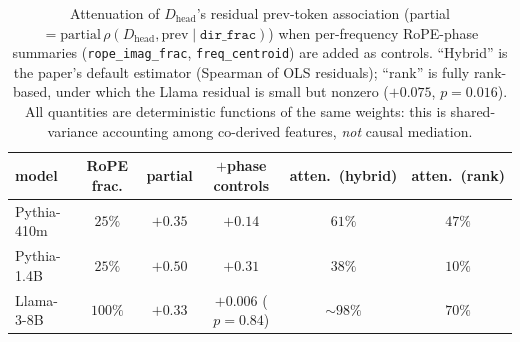 \documentclass[11pt]{article}
\newcommand{\dirfrac}{\texttt{dir\_frac}\xspace}
\newcommand{\Dhead}{\ensuremath{D_{\text{head}}}\xspace}
\newcommand{\ropeimag}{\texttt{rope\_imag\_frac}\xspace}
\newcommand{\Rope}{RoPE\xspace}
\begin{document}
\begin{table}[t]\centering\footnotesize\setlength{\tabcolsep}{4pt}
\begin{tabular}{lccccc}\toprule
model & \Rope frac. & partial & $+$phase controls & atten.\ (hybrid) & atten.\ (rank)\\\midrule
Pythia-410m & $25\%$  & $+0.35$ & $+0.14$ & $61\%$ & $47\%$\\
Pythia-1.4B & $25\%$  & $+0.50$ & $+0.31$ & $38\%$ & $10\%$\\
Llama-3-8B  & $100\%$ & $+0.33$ & $+0.006$ ($p{=}0.84$) & ${\sim}98\%$ & $70\%$\\
\bottomrule\end{tabular}
\caption{Attenuation of \Dhead's residual prev-token association (partial $=\mathrm{partial}\,\rho(\Dhead,
\text{prev}\mid\dirfrac)$) when per-frequency \Rope-phase summaries
(\ropeimag, \texttt{freq\_centroid}) are added as controls. ``Hybrid'' is the paper's default estimator (Spearman of
OLS residuals); ``rank'' is fully rank-based, under which the Llama residual is small but nonzero ($+0.075$,
$p{=}0.016$). All quantities are deterministic functions of the same weights: this is shared-variance accounting
among co-derived features, \emph{not} causal mediation.}
\label{tab:mediation}
\end{table}
\end{document}
